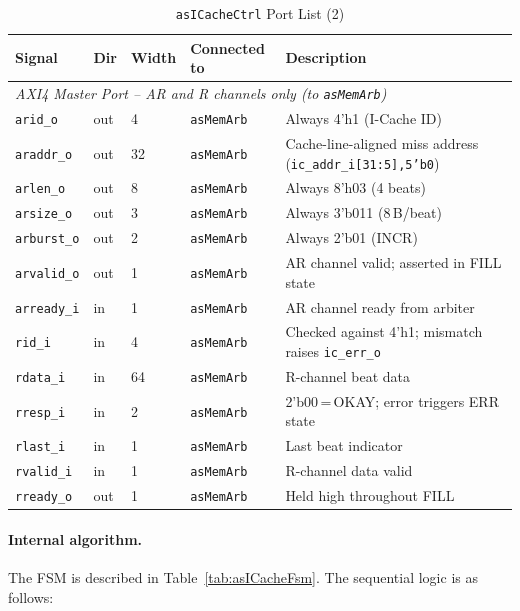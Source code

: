 \begin{table}[H]
\caption{\texttt{asICacheCtrl} Port List (2)}
\label{tab:asICacheCtrlPorts2}
\centering
\begin{tabularx}{\textwidth}{|l |l |l |l |X|}
  \hline
  Signal & Dir & Width & Connected to & Description \\
  \hline
  \hline 
  \multicolumn{5}{|l|}{\textit{AXI4 Master Port -- AR and R channels only (to \texttt{asMemArb})}} \\
  \hline
  \texttt{arid\_o}    & out & 4  & \texttt{asMemArb} & Always 4'h1 (I-Cache ID) \\
  \hline
  \texttt{araddr\_o}  & out & 32 & \texttt{asMemArb} & Cache-line-aligned miss address (\texttt{ic\_addr\_i[31:5],5'b0}) \\
  \hline
  \texttt{arlen\_o}   & out & 8  & \texttt{asMemArb} & Always 8'h03 (4 beats) \\
  \hline
  \texttt{arsize\_o}  & out & 3  & \texttt{asMemArb} & Always 3'b011 (8\,B/beat) \\
  \hline
  \texttt{arburst\_o} & out & 2  & \texttt{asMemArb} & Always 2'b01 (INCR) \\
  \hline
  \texttt{arvalid\_o} & out & 1  & \texttt{asMemArb} & AR channel valid; asserted in FILL state \\
  \hline
  \texttt{arready\_i} & in  & 1  & \texttt{asMemArb} & AR channel ready from arbiter \\
  \hline
  \texttt{rid\_i}     & in  & 4  & \texttt{asMemArb} & Checked against 4'h1; mismatch raises \texttt{ic\_err\_o} \\
  \hline
  \texttt{rdata\_i}   & in  & 64 & \texttt{asMemArb} & R-channel beat data \\
  \hline
  \texttt{rresp\_i}   & in  & 2  & \texttt{asMemArb} & 2'b00\,=\,OKAY; error triggers ERR state \\
  \hline
  \texttt{rlast\_i}   & in  & 1  & \texttt{asMemArb} & Last beat indicator \\
  \hline
  \texttt{rvalid\_i}  & in  & 1  & \texttt{asMemArb} & R-channel data valid \\
  \hline
  \texttt{rready\_o}  & out & 1  & \texttt{asMemArb} & Held high throughout FILL \\
  \hline
\end{tabularx}
\end{table}


\paragraph{Internal algorithm.}
The FSM is described in Table~\ref{tab:asICacheFsm}.
The sequential logic is as follows:

